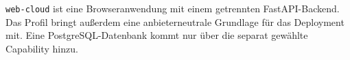 \begin{beginnerstatement}

\texttt{web-cloud} ist eine Browseranwendung mit einem getrennten
FastAPI-Backend. Das Profil bringt außerdem eine anbieterneutrale Grundlage
für das Deployment mit. Eine PostgreSQL-Datenbank kommt nur über die separat
gewählte Capability hinzu.

\end{beginnerstatement}
